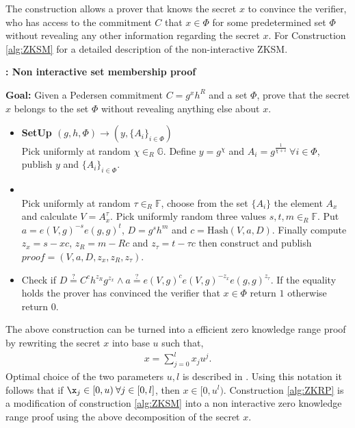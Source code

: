 The construction allows a prover that knows the secret $x$ to convince the verifier, who has access to the commitment $C$ that $x\in\Phi$ for some predetermined set $\Phi$ without revealing any other information regarding the secret $x$.  For Construction \ref{alg:ZKSM} for a detailed description of the non-interactive ZKSM.
\begin{algorithm}[]
\caption{\textbf{: Non interactive set membership proof}}
\textbf{Goal:} Given a Pedersen commitment $C=g^x h^R$ and a set $\Phi$, prove that the secret $x$ belongs to the set $\Phi$ without revealing anything else about $x$.
\vspace{2pt} \hline \vspace{2pt}
\begin{itemize}
  \item\textbf{SetUp $(g,h,\Phi)\xrightarrow[]{}(y,\{A_{i}\}_{i\in\Phi})$}\\
Pick uniformly at random $\chi\in_R\mathds{G}$. Define $y=g^\chi$ and $A_i=g^{\frac{1}{\chi+i}} \:\forall i\in\Phi$, publish $y$ and $\{A_i\}_{i\in\Phi}$.

\item{}\\
Pick uniformly at random $\tau\in_R\mathds{F}$, choose from the set $\{A_i\}$ the element $A_x$ and calculate $V=A_x^\tau$. Pick uniformly random three values $s,t,m\in_R\mathds{F}$. Put $a=e(V,g)^{-s}e(g,g)^t$, $D=g^sh^m$ and $c=\text{Hash}(V,a,D)$. Finally compute $z_x = s-x c$, $z_R = m-Rc$ and $z_\tau= t-\tau c$ then construct and publish $\textit{proof} = (V,a,D,z_x,z_R,z_\tau)$.

\item{}
Check if $D\overset{?}{=}C^ch^{z_R}g^{z_x}\wedge a \overset{?}{=} e(V,g)^c e(V,g)^{-z_x}e(g,g)^{z_\tau}$. If the equality holds the prover has convinced the verifier that $x\in\Phi$ return $1$ otherwise return $0$.
\end{itemize}
\label{alg:ZKSM}
\end{algorithm}

The above construction can be turned into a efficient zero knowledge range proof by rewriting the secret $x$ into base $u$ such that,
\begin{align*}
    x = \sum_{j=0}^l x_ju^j.
\end{align*}
Optimal choice of the two parameters $u,l$ is described in \cite{PR}. 
Using this notation it follows that if $\x_j\in[0,u)\: \forall j\in[0,l]$, then $x\in[0,u^l)$. Construction \ref{alg:ZKRP} is a modification of construction \ref{alg:ZKSM} into a non interactive zero knowledge range proof using the above decomposition of the secret $x$.

